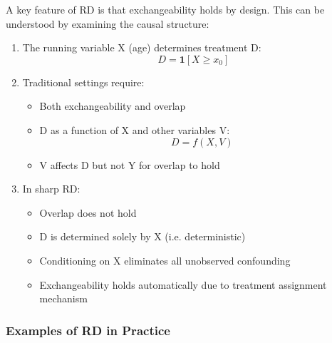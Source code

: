 A key feature of RD is that exchangeability holds by design. This can be understood by examining the causal structure:

\begin{enumerate}
    \item The running variable X (age) determines treatment D:
    \[D = \mathbf{1}[X \geq x_0]\]
    
    \item Traditional settings require:
    \begin{itemize}
        \item Both exchangeability and overlap
        \item D as a function of X and other variables V:
        \[D = f(X,V)\]
        \item V affects D but not Y for overlap to hold
    \end{itemize}
    
    \item In sharp RD:
    \begin{itemize}
        \item Overlap does not hold
        \item D is determined solely by X (i.e. deterministic)
        \item Conditioning on X eliminates all unobserved confounding
        \item Exchangeability holds automatically due to treatment assignment mechanism
    \end{itemize}
\end{enumerate}

\subsubsection{Examples of RD in Practice}

